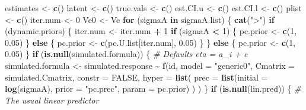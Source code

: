 \documentclass[
]{article}
\newenvironment{Shaded}{\begin{snugshade}}{\end{snugshade}}
\newcommand{\AttributeTok}[1]{\textcolor[rgb]{0.13,0.29,0.53}{#1}}
\newcommand{\CommentTok}[1]{\textcolor[rgb]{0.56,0.35,0.01}{\textit{#1}}}
\newcommand{\ConstantTok}[1]{\textcolor[rgb]{0.56,0.35,0.01}{#1}}
\newcommand{\ControlFlowTok}[1]{\textcolor[rgb]{0.13,0.29,0.53}{\textbf{#1}}}
\newcommand{\DecValTok}[1]{\textcolor[rgb]{0.00,0.00,0.81}{#1}}
\newcommand{\FloatTok}[1]{\textcolor[rgb]{0.00,0.00,0.81}{#1}}
\newcommand{\FunctionTok}[1]{\textcolor[rgb]{0.13,0.29,0.53}{\textbf{#1}}}
\newcommand{\NormalTok}[1]{#1}
\newcommand{\OtherTok}[1]{\textcolor[rgb]{0.56,0.35,0.01}{#1}}
\newcommand{\SpecialCharTok}[1]{\textcolor[rgb]{0.81,0.36,0.00}{\textbf{#1}}}
\newcommand{\StringTok}[1]{\textcolor[rgb]{0.31,0.60,0.02}{#1}}
\begin{document}
\begin{Shaded}
\begin{Highlighting}[]
\NormalTok{  estimates }\OtherTok{\textless{}{-}} \FunctionTok{c}\NormalTok{()}
\NormalTok{  latent }\OtherTok{\textless{}{-}} \FunctionTok{c}\NormalTok{()}
\NormalTok{  true.vals }\OtherTok{\textless{}{-}} \FunctionTok{c}\NormalTok{()}
\NormalTok{  est.CI.u }\OtherTok{\textless{}{-}} \FunctionTok{c}\NormalTok{()}
\NormalTok{  est.CI.l }\OtherTok{\textless{}{-}} \FunctionTok{c}\NormalTok{()}
\NormalTok{  plist }\OtherTok{\textless{}{-}} \FunctionTok{c}\NormalTok{()}
\NormalTok{  iter.num }\OtherTok{\textless{}{-}} \DecValTok{0}
\NormalTok{  Ve0 }\OtherTok{\textless{}{-}}\NormalTok{ Ve}
  \ControlFlowTok{for}\NormalTok{ (sigmaA }\ControlFlowTok{in}\NormalTok{ sigmaA.list) \{}
    \FunctionTok{cat}\NormalTok{(}\StringTok{"\textgreater{}"}\NormalTok{)}
    \ControlFlowTok{if}\NormalTok{ (dynamic.priors) \{}
\NormalTok{      iter.num }\OtherTok{\textless{}{-}}\NormalTok{ iter.num }\SpecialCharTok{+} \DecValTok{1}
      \ControlFlowTok{if}\NormalTok{ (sigmaA }\SpecialCharTok{\textless{}} \DecValTok{1}\NormalTok{) \{}
\NormalTok{        pc.prior }\OtherTok{\textless{}{-}} \FunctionTok{c}\NormalTok{(}\DecValTok{1}\NormalTok{, }\FloatTok{0.05}\NormalTok{)}
\NormalTok{      \} }\ControlFlowTok{else}\NormalTok{ \{}
\NormalTok{        pc.prior }\OtherTok{\textless{}{-}} \FunctionTok{c}\NormalTok{(pc.U.list[iter.num], }\FloatTok{0.05}\NormalTok{)}
\NormalTok{      \}}
\NormalTok{    \} }\ControlFlowTok{else}\NormalTok{ \{}
\NormalTok{      pc.prior }\OtherTok{\textless{}{-}} \FunctionTok{c}\NormalTok{(}\DecValTok{1}\NormalTok{, }\FloatTok{0.05}\NormalTok{)}
\NormalTok{    \}}
    \ControlFlowTok{if}\NormalTok{ (}\FunctionTok{is.null}\NormalTok{(simulated.formula)) \{ }\CommentTok{\# Defaults eta = a\_i + e}
\NormalTok{      simulated.formula }\OtherTok{\textless{}{-}}\NormalTok{ simulated.response }\SpecialCharTok{\textasciitilde{}}  \FunctionTok{f}\NormalTok{(id,}
        \AttributeTok{model =} \StringTok{"generic0"}\NormalTok{,}
        \AttributeTok{Cmatrix =}\NormalTok{ simulated.Cmatrix,}
        \AttributeTok{constr =} \ConstantTok{FALSE}\NormalTok{,}
        \AttributeTok{hyper =} \FunctionTok{list}\NormalTok{(}
          \AttributeTok{prec =} \FunctionTok{list}\NormalTok{(}\AttributeTok{initial =} \FunctionTok{log}\NormalTok{(sigmaA), }\AttributeTok{prior =} \StringTok{"pc.prec"}\NormalTok{,}
                      \AttributeTok{param =}\NormalTok{ pc.prior)}
\NormalTok{        )}
\NormalTok{      )}
\NormalTok{    \}}
    \ControlFlowTok{if}\NormalTok{ (}\FunctionTok{is.null}\NormalTok{(lin.pred)) \{ }\CommentTok{\# The \textquotesingle{}usual\textquotesingle{} linear predictor}

\end{Highlighting}
\end{Shaded}
\end{document}
